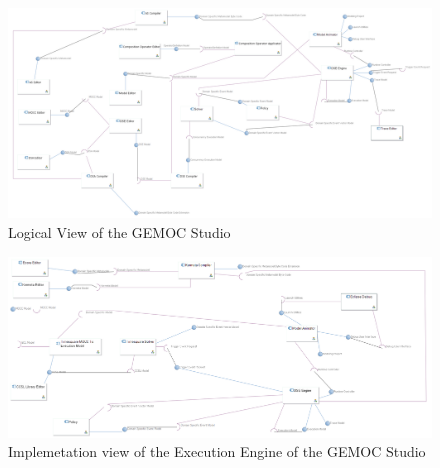 \documentclass{gemoc} %
\begin{document}
\begin{figure}[htp]
	\begin{center}
	\includegraphics*[trim=0.0cm 0.0cm 0cm 0.0cm, clip=true, angle=90, totalheight=0.9\textheight]{../images/generated/LogicalView.png}
	\caption{Logical View of the GEMOC Studio}
	\label{fig:LogicalView}
	\end{center}
\end{figure}
\begin{figure}[htp]
	\begin{center}
	\includegraphics*[trim=0.0cm 0.0cm 0cm 0.0cm, clip=true, angle=90, totalheight=0.9\textheight]{../images/generated/TimesquareImplementation.png}
	\caption{Implemetation view of the Execution Engine of the GEMOC Studio}
	\label{fig:TimesquareImplementation}
	\end{center}
\end{figure}
\end{document}
